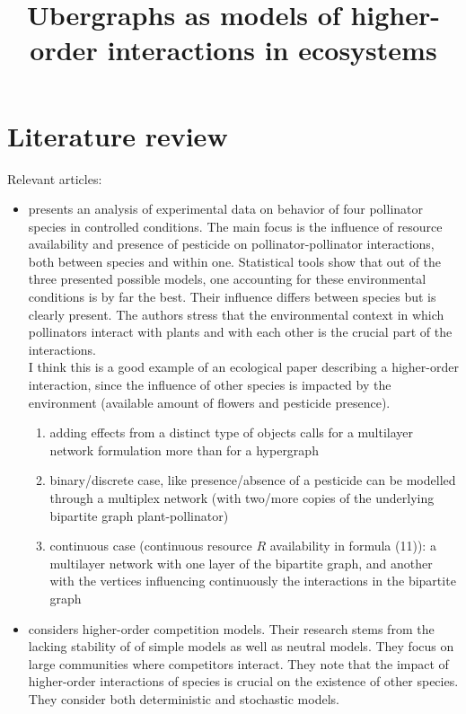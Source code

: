 \documentclass[a4paper,12pt]{article}
\title{Ubergraphs as models of higher-order interactions in ecosystems}
\theoremstyle{definition}
\theoremstyle{remark}
\begin{document}
\appendix\section{Literature review}

Relevant articles:
\begin{itemize}

\item \cite{Cervantes_2021} presents an analysis of experimental data on behavior of four pollinator species in controlled conditions. The main focus is the influence of resource availability and presence of pesticide on pollinator-pollinator interactions, both between species and within one. Statistical tools show that out of the three presented possible models, one accounting for these environmental conditions is by far the best. Their influence differs between species but is clearly present. The authors stress that the environmental context in which pollinators interact with plants and with each other is the crucial part of the interactions. \\
I think this is a good example of an ecological paper describing a higher-order interaction, since the influence of other species is impacted by the environment (available amount of flowers and pesticide presence).
\begin{enumerate}
    \item adding effects from a distinct type of objects calls for a multilayer network formulation more than for a hypergraph 
    \item binary/discrete case, like presence/absence of a pesticide can be modelled through a multiplex network (with two/more copies of the underlying bipartite graph plant-pollinator)
    \item continuous case (continuous resource $R$ availability in formula (11)): a multilayer network with one layer of the bipartite graph, and another with the vertices influencing continuously the interactions in the bipartite graph
\end{enumerate}

\item \cite{Grilli2017} considers higher-order competition models. Their research stems from the lacking stability of of simple models as well as neutral models. They focus on large communities where competitors interact. They note that the impact of higher-order interactions of species is crucial on the existence of other species. They consider both deterministic and stochastic models.


\end{itemize}
\end{document}
